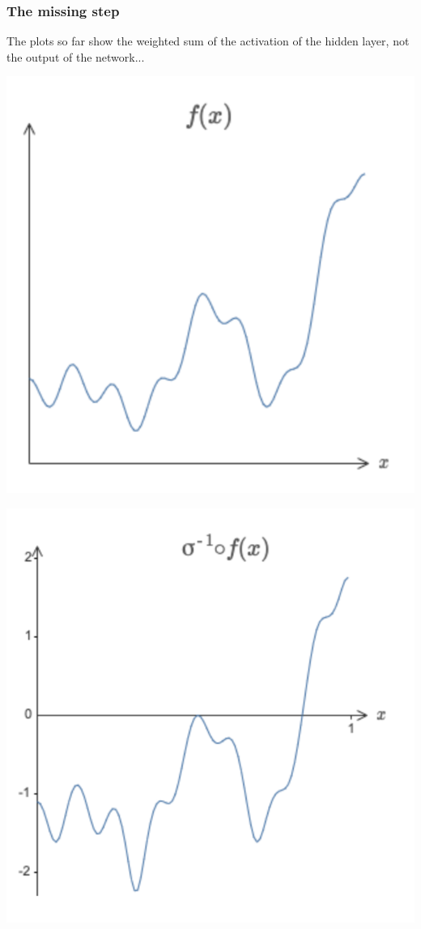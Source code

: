 \documentclass[usenames,dvipsnames]{beamer}
\begin{document}
\begin{frame}
  \frametitle{The missing step}
  
The plots so far show the weighted sum of the activation of the hidden layer, not the output of the network...

\pause

\begin{minipage}[c]{.45\textwidth}
	\centering
	\includegraphics[scale=.3]{f} 
\end{minipage} \hfill \begin{minipage}[c]{.45\textwidth}
\includegraphics[scale=.3]{sigma-1f}
\end{minipage}
  

\end{frame}
\end{document}
